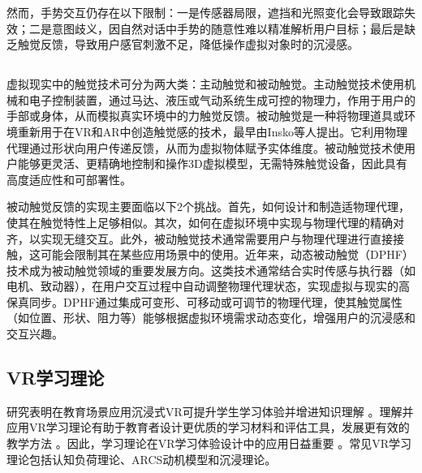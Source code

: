 \documentclass[runningheads]{llncs}
\begin{document}
然而，手势交互仍存在以下限制\cite{herbert2024static,app14114935}：一是传感器局限，遮挡和光照变化会导致跟踪失效；二是意图歧义，因自然对话中手势的随意性难以精准解析用户目标；最后是缺乏触觉反馈，导致用户感官刺激不足，降低操作虚拟对象时的沉浸感。

\subsection{}
虚拟现实中的触觉技术可分为两大类：主动触觉和被动触觉。主动触觉技术使用机械和电子控制装置，通过马达、液压或气动系统生成可控的物理力，作用于用户的手部或身体，从而模拟真实环境中的力触觉反馈\cite{vaghela2021active}。被动触觉是一种将物理道具或环境重新用于在VR和AR中创造触觉感的技术，最早由Insko等人提出\cite{insko2001passive}。它利用物理代理通过形状向用户传递反馈，从而为虚拟物体赋予实体维度。被动触觉技术使用户能够更灵活、更精确地控制和操作3D虚拟模型，无需特殊触觉设备，因此具有高度适应性和可部署性\cite{henderson2008opportunistic,shapira2016tactilevr,10.1145/3313831.3376313}。

被动触觉反馈的实现主要面临以下2个挑战。首先，如何设计和制造适物理代理，使其在触觉特性上足够相似。其次，如何在虚拟环境中实现与物理代理的精确对齐，以实现无缝交互\cite{zenner2021combining}。此外，被动触觉技术通常需要用户与物理代理进行直接接触，这可能会限制其在某些应用场景中的使用。近年来，动态被动触觉（DPHF）技术成为被动触觉领域的重要发展方向。这类技术通常结合实时传感与执行器（如电机、致动器），在用户交互过程中自动调整物理代理状态，实现虚拟与现实的高保真同步。DPHF通过集成可变形、可移动或可调节的物理代理，使其触觉属性（如位置、形状、阻力等）能够根据虚拟环境需求动态变化，增强用户的沉浸感和交互兴趣\cite{zenner2017shifty}。


\subsection{}


\subsection{VR学习理论}
研究表明在教育场景应用沉浸式VR可提升学生学习体验并增进知识理解 \cite{freina2015literature}。理解并应用VR学习理论有助于教育者设计更优质的学习材料和评估工具，发展更有效的教学方法 \cite{matovu2023immersive}。因此，学习理论在VR学习体验设计中的应用日益重要 \cite{marougkas2023virtual}。常见VR学习理论包括认知负荷理论、ARCS动机模型和沉浸理论。
\end{document}
